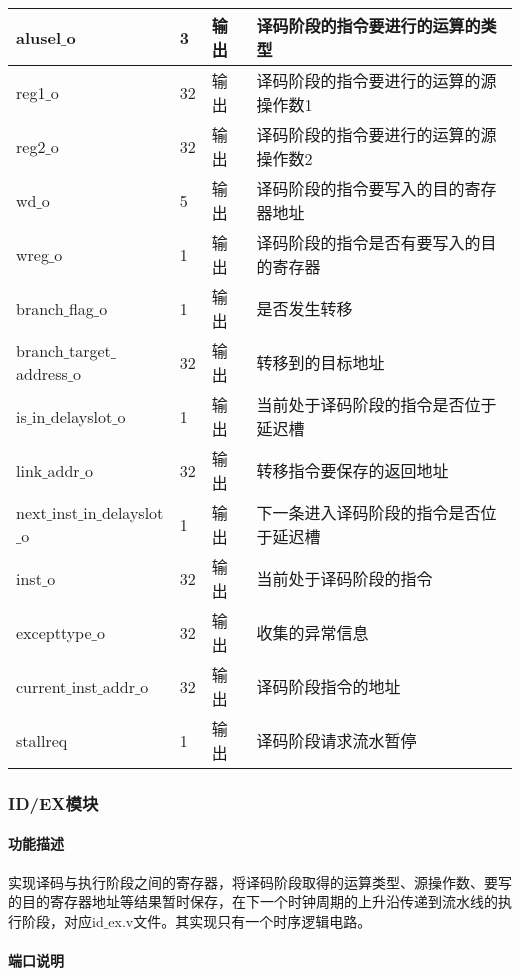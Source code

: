 \begin{table}[H]
\begin{tabular}{|l|l|l|l|}
		\hline
		alusel$\_$o & 3 & 输出 & 译码阶段的指令要进行的运算的类型 \\
		\hline
		reg1$\_$o & 32 & 输出 & 译码阶段的指令要进行的运算的源操作数1 \\
		\hline
		reg2$\_$o & 32 & 输出 & 译码阶段的指令要进行的运算的源操作数2 \\
		\hline
		wd$\_$o & 5 & 输出 & 译码阶段的指令要写入的目的寄存器地址 \\
		\hline
		wreg$\_$o & 1 & 输出 & 译码阶段的指令是否有要写入的目的寄存器 \\
		\hline
		branch$\_$flag$\_$o & 1 & 输出 & 是否发生转移 \\
		\hline
		branch$\_$target$\_$address$\_$o & 32 & 输出 & 转移到的目标地址 \\
		\hline
		is$\_$in$\_$delayslot$\_$o & 1 & 输出 & 当前处于译码阶段的指令是否位于延迟槽 \\
		\hline
		link$\_$addr$\_$o & 32 & 输出 & 转移指令要保存的返回地址 \\
		\hline
		next$\_$inst$\_$in$\_$delayslot$\_$o & 1 & 输出 & 下一条进入译码阶段的指令是否位于延迟槽 \\
		\hline
		inst$\_$o & 32 & 输出 & 当前处于译码阶段的指令 \\
		\hline
		excepttype$\_$o & 32 & 输出 & 收集的异常信息 \\
		\hline
		current$\_$inst$\_$addr$\_$o & 32 & 输出 & 译码阶段指令的地址 \\
		\hline
		stallreq & 1 & 输出 & 译码阶段请求流水暂停 \\
		\hline
	\end{tabular}
\end{table}
\subsubsection{ID/EX模块}
\paragraph{功能描述}
\quad

\quad

实现译码与执行阶段之间的寄存器，将译码阶段取得的运算类型、源操作数、要写的目的寄存器地址等结果暂时保存，在下一个时钟周期的上升沿传递到流水线的执行阶段，对应id$\_$ex.v文件。其实现只有一个时序逻辑电路。
\paragraph{端口说明}
\quad

